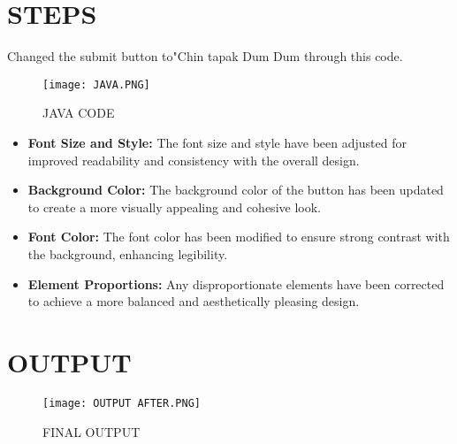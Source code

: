\documentclass{exam}
\begin{document}
	
	\begin{center}
	\end{center}
	
	\section{STEPS}
	Changed the submit button to"Chin tapak Dum Dum through this code.
	\begin{figure}[h!]
		\centering
		\texttt{[image: JAVA.PNG]}
		\caption{JAVA CODE}
		\label{fig:enter-label}
	\end{figure}
	\begin{itemize}
		\item \textbf{Font Size and Style:} The font size and style have been adjusted for improved readability and consistency with the overall design.
		\item \textbf{Background Color:} The background color of the button has been updated to create a more visually appealing and cohesive look.
		\item \textbf{Font Color:} The font color has been modified to ensure strong contrast with the background, enhancing legibility.
		\item \textbf{Element Proportions:} Any disproportionate elements have been corrected to achieve a more balanced and aesthetically pleasing design.
	\end{itemize}
	\section{OUTPUT}
	\begin{figure}
		\centering
		\texttt{[image: OUTPUT AFTER.PNG]}
		\caption{FINAL OUTPUT}
		\label{fig:enter-label}
	\end{figure}
\end{document}
